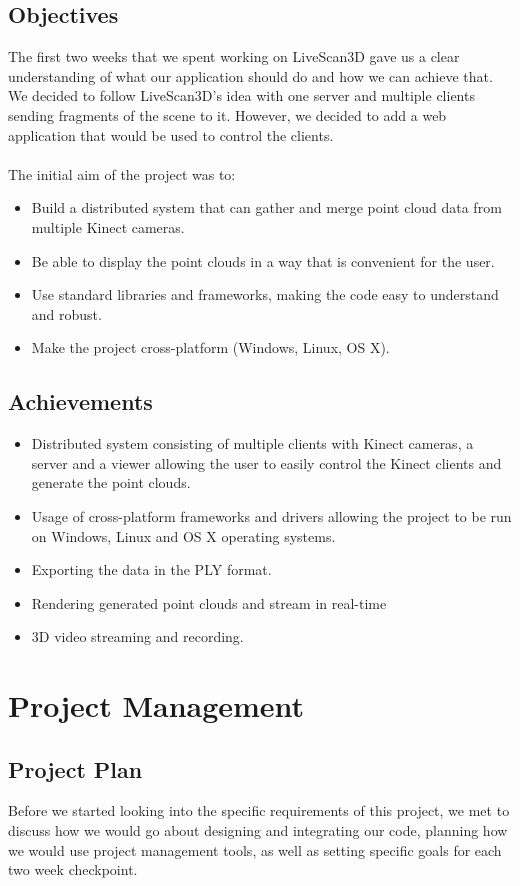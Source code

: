 \documentclass{article}
\begin{document}
\subsection{Objectives}
The first two weeks that we spent working on LiveScan3D gave us a clear understanding of what our application
should do and how we can achieve that. We decided to follow LiveScan3D's idea with one server and multiple
clients sending fragments of the scene to it. However, we decided to add a web application that would be used
to control the clients.
\\\\
The initial aim of the project was to:
\begin{itemize}
  \item Build a distributed system that can gather and merge point cloud data from multiple Kinect cameras.
  \item Be able to display the point clouds in a way that is convenient for the user.
  \item Use standard libraries and frameworks, making the code easy to understand and robust.
  \item Make the project cross-platform (Windows, Linux, OS X).
\end{itemize}

\subsection{Achievements}
\begin{itemize}
  \item Distributed system consisting of multiple clients with Kinect cameras, a server and a viewer allowing the user to easily control the Kinect clients and generate the point clouds.
  \item Usage of cross-platform frameworks and drivers allowing the project to be run on Windows, Linux and OS X operating systems.
  \item Exporting the data in the PLY format.
  \item Rendering generated point clouds and stream in real-time
  \item 3D video streaming and recording.
\end{itemize}

\newpage
\section{Project Management}
\subsection{Project Plan}
Before we started looking into the specific requirements of this project, we met to discuss how we would go about designing and integrating our code, planning how we would use project management tools, as well as setting specific goals for each two week checkpoint.
\end{document}
